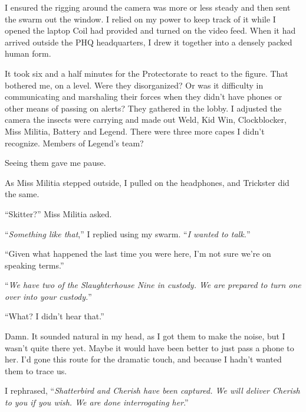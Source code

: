 I ensured the rigging around the camera was more or less steady and then sent the swarm out the window.  I relied on my power to keep track of it while I opened the laptop Coil had provided and turned on the video feed.  When it had arrived outside the PHQ headquarters, I drew it together into a densely packed human form.



It took six and a half minutes for the Protectorate to react to the figure.  That bothered me, on a level.  Were they disorganized?  Or was it difficulty in communicating and marshaling their forces when they didn't have phones or other means of passing on alerts?  They gathered in the lobby.  I adjusted the camera the insects were carrying and made out Weld, Kid Win, Clockblocker, Miss Militia, Battery and Legend.  There were three more capes I didn't recognize.  Members of Legend's team?



Seeing them gave me pause.



As Miss Militia stepped outside, I pulled on the headphones, and Trickster did the same.



``Skitter?'' Miss Militia asked.



``\emph{Something like that},'' I replied using my swarm.  ``\emph{I wanted to talk.}''



``Given what happened the last time you were here, I'm not sure we're on speaking terms.''



``\emph{We have two of the Slaughterhouse Nine in custody.  We are prepared to turn one over into your custody.}''



``What?  I didn't hear that.''



Damn.  It sounded natural in my head, as I got them to make the noise, but I wasn't quite there yet.  Maybe it would have been better to just pass a phone to her.  I'd gone this route for the dramatic touch, and because I hadn't wanted them to trace us.



I rephrased, ``\emph{Shatterbird and Cherish have been captured.  We will deliver Cherish to you if you wish.  We are done interrogating her}.''



